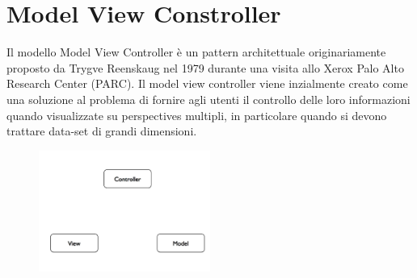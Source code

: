\documentclass{article}
\begin{document}
\maketitle



\newpage
\tableofcontents
\newpage



\section{Model View Constroller}
Il modello Model View Controller \`e un pattern architettuale originariamente proposto da Trygve Reenskaug nel 1979 durante una visita allo  Xerox Palo Alto Research Center (PARC). Il model view controller viene inzialmente creato come una soluzione al problema di fornire agli utenti il controllo delle loro informazioni quando visualizzate su perspectives multipli, in particolare quando si devono trattare data-set di grandi dimensioni.

\begin{figure}[h]
\centering
\includegraphics[width=0.5\textwidth]{Img/MVC1.pdf}
\end{figure}
\end{document}

